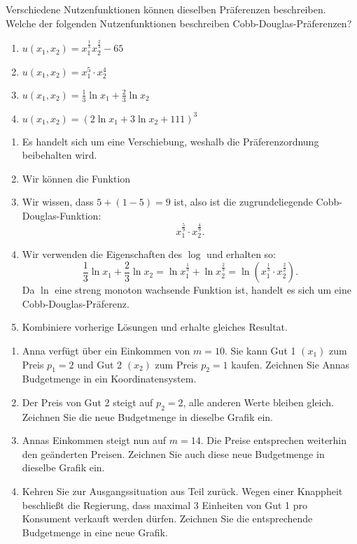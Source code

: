 \begin{question}
	Verschiedene Nutzenfunktionen können dieselben Präferenzen beschreiben. Welche der folgenden Nutzenfunktionen beschreiben Cobb-Douglas-Präferenzen?
	\begin{enumerate}
		\item  \( u(x_1, x_2) = x_1^{\frac{1}{3}} x_2^{\frac{2}{3}} -65 \)
		\item \( u(x_1, x_2) = x_1^5 \cdot x_2^4 \)
		\item  \( u(x_1, x_2) = \frac{1}{3} \ln x_1 + \frac{2}{3} \ln x_2 \)
		\item \( u(x_1, x_2) = \left( 2 \ln x_1 + 3 \ln x_2 + 111 \right)^3 \)
	\end{enumerate}
\end{question}
\begin{solution}
	\begin{enumerate}
		\item Es handelt sich um eine Verschiebung, weshalb die Präferenzordnung beibehalten wird.
		\item Wir können die Funktion
		\item Wir wissen, dass $5 + (1-5) = 9$ ist, also ist die zugrundeliegende Cobb-Douglas-Funktion:
		      \[
			      x_1^{\frac{5}{9}} \cdot x_2^{\frac{4}{9}}
			      .\]
		\item Wir verwenden die Eigenschaften des $\log$ und erhalten so:
		      \[
			      \frac{1}{3} \ln x_1 + \frac{2}{3} \ln x_2 = \ln x_1^{\frac{1}{3}}+ \ln x_2^{\frac{2}{3}} = \ln \left( x_1^{\frac{1}{3}} \cdot x_2^{\frac{2}{2}} \right)
			      .\]
		      Da $\ln$ eine streng monoton wachsende Funktion ist, handelt es sich um eine Cobb-Douglas-Präferenz.

		\item Kombiniere vorherige Lösungen und erhalte gleiches Resultat.
	\end{enumerate}
\end{solution}

\begin{question}[subtitle=Budgetmengen]
	\begin{enumerate}
		\item Anna verfügt über ein Einkommen von $m= 10$. Sie kann Gut 1 $(x_1)$ zum Preis $p_1 = 2$ und Gut 2
		      $(x_2)$ zum Preis $p_2 = 1$ kaufen. Zeichnen Sie Annas Budgetmenge in ein Koordinatensystem.
		\item Der Preis von Gut 2 steigt auf $p_2 = 2$, alle anderen Werte bleiben gleich. Zeichnen Sie die
		      neue Budgetmenge in dieselbe Grafik ein.
		\item Annas Einkommen steigt nun auf $m = 14$. Die Preise entsprechen weiterhin den geänderten Preisen.
		      Zeichnen Sie auch diese neue Budgetmenge in dieselbe Grafik ein.
		\item Kehren Sie zur Ausgangssituation aus Teil zurück. Wegen einer Knappheit beschließt die Regierung, dass maximal 3 Einheiten von Gut 1 pro Konsument verkauft werden dürfen. Zeichnen Sie die  entsprechende Budgetmenge in eine neue Grafik.
	\end{enumerate}
\end{question}

